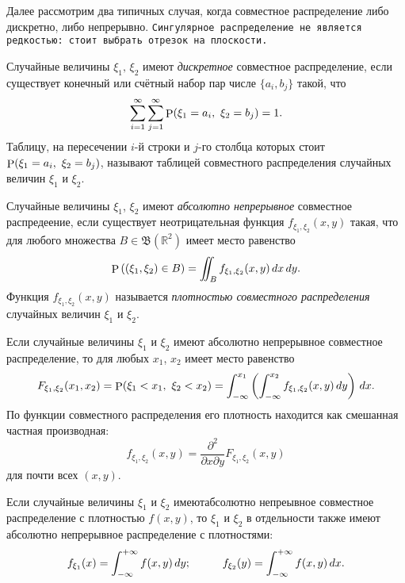 Далее рассмотрим два типичных случая, когда совместное распределение либо дискретно, либо непрерывно.
\texttt{Сингулярное распределение не является редкостью: стоит выбрать отрезок на плоскости.} 

\begin{to_def}
    Случайные величины $\xi_1, \, \xi_2$ имеют \textit{дискретное} совместное распределение, если существует конечный или счётный набор пар числе $\{a_i, b_j\}$ такой, что
    \begin{equation*}
        \sum_{i=1}^{\infty} \sum_{j=1}^{\infty} \P (\xi_1 = a_i, \ \xi_2 = b_j) = 1.
    \end{equation*}
    Таблицу, на пересечении $i$-й строки и $j$-го столбца которых стоит $\P(\xi_1 = a_i, \ \xi_2 = b_j)$, называют таблицей совместного распределения случайных величин $\xi_1$ и $\xi_2$. 
\end{to_def}

\begin{to_def}
    Случайные величины $\xi_1$, $\xi_2$ имеют \textit{абсолютно непрерывное} совместное распредеение, если существует неотрицательная функция $f_{\xi_1, \xi_2} (x, y)$ такая, что для любого множества $B \in \mathfrak B (\mathbb{R}^2)$ имеет место равенство
    \begin{equation*}
         \P \left(
            (\xi_1, \xi_2) \in B
         \right) = \iint_B f_{\xi_1, \xi_2} (x, y) \d x \d y.
     \end{equation*} 
     Функция $f_{\xi_1, \xi_2} (x, y)$ называется \textit{плотностью совместного распределения} случайных величин $\xi_1$ и $\xi_2$.
\end{to_def}

Если случайные величины $\xi_1$ и $\xi_2$ имеют абсолютно непрерывное совместное распределение, то для любых $x_1$, $x_2$ имеет место равенство
\begin{equation*}
    F_{\xi_1, \xi_2} (x_1, x_2) = \P(\xi_1 < x_1, \ \xi_2 < x_2) = \int_{-\infty}^{x_1} \left(
        \int_{-\infty}^{x_2} f_{\xi_1, \xi_2} (x, y) \d y
    \right) \d x.
\end{equation*}
По функции совместного распределения его плотность находится как смешанная частная производная:
\begin{equation*}
    f_{\xi_1, \xi_2} (x, y) = \frac{\partial^2 }{\partial x \partial y} F_{\xi_1, \xi_2} (x, y)
\end{equation*}
для почти всех $(x, y)$. 

\begin{to_thr}[]
    Если случайные величины $\xi_1$ и $\xi_2$ имеютабсолютно непреывное совместное распределение с плотностью $f(x, y)$, то $\xi_1$ и $\xi_2$ в отдельности также имеют абсолютно непрерывное распределение с плотностями:
    \begin{equation*}
        f_{\xi_1} (x) = \int_{-\infty}^{+\infty} f(x, y) \d y;
        \hspace{10 mm}
        f_{\xi_2} (y) = \int_{-\infty}^{+\infty} f(x, y) \d x.
    \end{equation*}
\end{to_thr}